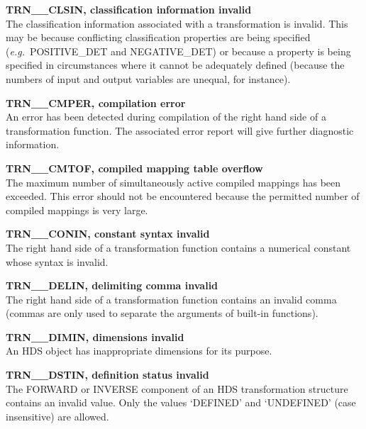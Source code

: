 \documentclass[twoside,nolof,11pt]{starlink}
\providecommand{\name}[1]{\small{#1}}
\begin{document}
\begin{description}

\item \textbf{TRN\_\_CLSIN, classification information invalid}\\
The classification information associated with a transformation is invalid.
This may be because conflicting classification properties are being
specified (\emph{e.g.}\ \name{POSITIVE\_DET} and \name{NEGATIVE\_DET}) or
because a property is being specified in circumstances where it cannot be
adequately defined (because the numbers of input and output variables
are unequal, for instance).

\item \textbf{TRN\_\_CMPER, compilation error}\\
An error has been detected during compilation of the right hand side of a
transformation function.
The associated error report will give further diagnostic information.

\item \textbf{TRN\_\_CMTOF, compiled mapping table overflow}\\
The maximum number of simultaneously active compiled mappings has
been exceeded.
This error should not be encountered because the permitted number of
compiled mappings is very large.

\item \textbf{TRN\_\_CONIN, constant syntax invalid}\\
The right hand side of a transformation function contains a numerical
constant whose syntax is invalid.

\item \textbf{TRN\_\_DELIN, delimiting comma invalid}\\
The right hand side of a transformation function contains an invalid comma
(commas are only used to separate the arguments of built-in functions).

\item \textbf{TRN\_\_DIMIN, dimensions invalid}\\
An \name{HDS} object has inappropriate dimensions for its purpose.

\item \textbf{TRN\_\_DSTIN, definition status invalid}\\
The \name{FORWARD} or \name{INVERSE} component of an \name{HDS}
transformation structure contains an invalid value.
Only the values \name{`DEFINED'} and \name{`UNDEFINED'} (case insensitive)
are allowed.


\end{description}
\end{document}
